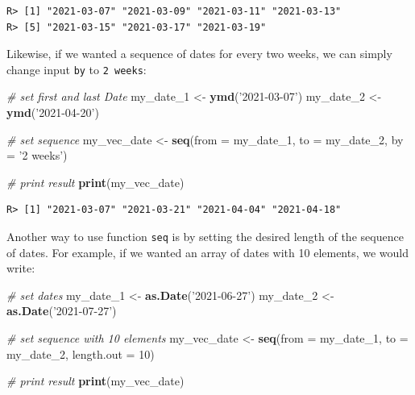 \documentclass[
  12pt,
]{book}
\newenvironment{Shaded}{\begin{snugshade}}{\end{snugshade}}
\newcommand{\CommentTok}[1]{\textcolor[rgb]{0.37,0.37,0.37}{\textit{#1}}}
\newcommand{\DataTypeTok}[1]{\textcolor[rgb]{0.27,0.27,0.27}{#1}}
\newcommand{\DecValTok}[1]{\textcolor[rgb]{0.06,0.06,0.06}{#1}}
\newcommand{\KeywordTok}[1]{\textcolor[rgb]{0.27,0.27,0.27}{\textbf{#1}}}
\newcommand{\NormalTok}[1]{#1}
\newcommand{\StringTok}[1]{\textcolor[rgb]{0.5,0.5,0.5}{#1}}
\begin{document}
\begin{verbatim}
R> [1] "2021-03-07" "2021-03-09" "2021-03-11" "2021-03-13"
R> [5] "2021-03-15" "2021-03-17" "2021-03-19"
\end{verbatim}

Likewise, if we wanted a sequence of dates for every two weeks, we can simply change input \texttt{by} to \texttt{\textquotesingle{}2\ weeks\textquotesingle{}}:

\begin{Shaded}
\begin{Highlighting}[]
\CommentTok{# set first and last Date}
\NormalTok{my_date_}\DecValTok{1}\NormalTok{ <-}\StringTok{ }\KeywordTok{ymd}\NormalTok{(}\StringTok{'2021-03-07'}\NormalTok{)}
\NormalTok{my_date_}\DecValTok{2}\NormalTok{ <-}\StringTok{ }\KeywordTok{ymd}\NormalTok{(}\StringTok{'2021-04-20'}\NormalTok{)}

\CommentTok{# set sequence}
\NormalTok{my_vec_date <-}\StringTok{ }\KeywordTok{seq}\NormalTok{(}\DataTypeTok{from =}\NormalTok{ my_date_}\DecValTok{1}\NormalTok{,}
                   \DataTypeTok{to =}\NormalTok{ my_date_}\DecValTok{2}\NormalTok{,}
                   \DataTypeTok{by =} \StringTok{'2 weeks'}\NormalTok{)}

\CommentTok{# print result}
\KeywordTok{print}\NormalTok{(my_vec_date)}
\end{Highlighting}
\end{Shaded}

\begin{verbatim}
R> [1] "2021-03-07" "2021-03-21" "2021-04-04" "2021-04-18"
\end{verbatim}

Another way to use function \texttt{seq} is by setting the desired length of the sequence of dates. For example, if we wanted an array of dates with 10 elements, we would write:

\begin{Shaded}
\begin{Highlighting}[]
\CommentTok{# set dates}
\NormalTok{my_date_}\DecValTok{1}\NormalTok{ <-}\StringTok{ }\KeywordTok{as.Date}\NormalTok{(}\StringTok{'2021-06-27'}\NormalTok{)}
\NormalTok{my_date_}\DecValTok{2}\NormalTok{ <-}\StringTok{ }\KeywordTok{as.Date}\NormalTok{(}\StringTok{'2021-07-27'}\NormalTok{)}

\CommentTok{# set sequence with 10 elements}
\NormalTok{my_vec_date <-}\StringTok{ }\KeywordTok{seq}\NormalTok{(}\DataTypeTok{from =}\NormalTok{ my_date_}\DecValTok{1}\NormalTok{,}
                   \DataTypeTok{to =}\NormalTok{ my_date_}\DecValTok{2}\NormalTok{,}
                   \DataTypeTok{length.out =} \DecValTok{10}\NormalTok{)}

\CommentTok{# print result}
\KeywordTok{print}\NormalTok{(my_vec_date)}
\end{Highlighting}
\end{Shaded}
\end{document}
